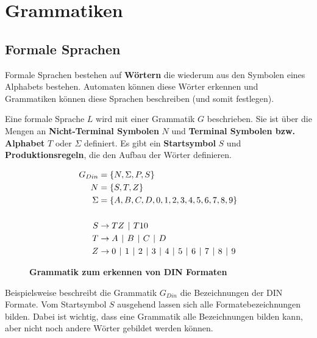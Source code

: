 

\section{Grammatiken}

\subsection{Formale Sprachen}

Formale Sprachen bestehen auf \textbf{Wörtern} die wiederum aus den Symbolen eines Alphabets
bestehen. Automaten können diese Wörter erkennen und Grammatiken können diese
Sprachen beschreiben (und somit festlegen).

Eine formale Sprache $L$ wird mit einer Grammatik $G$ beschrieben.
Sie ist über die Mengen an \textbf{Nicht-Terminal Symbolen} $N$ und
\textbf{Terminal Symbolen bzw. Alphabet} $T$ oder $\Sigma$ definiert. Es gibt ein \textbf{Startsymbol} $S$ und
\textbf{Produktionsregeln}, die den Aufbau der Wörter definieren.

\begin{figure}[h]
    \centering
    \Large
    \begin{align*}
        G_{Din} & = \{N, \Sigma, P, S\} \\
        N & = \{S, T, Z\} \\
        \Sigma & = \{A, B, C, D, 0, 1, 2, 3, 4, 5, 6, 7, 8, 9\} \\
        \\
        S & \rightarrow TZ \mkern7mu | \mkern7mu T10 \\
        T & \rightarrow A \mkern7mu | \mkern7mu B \mkern7mu | \mkern7mu C \mkern7mu | \mkern7mu D \\
        Z & \rightarrow 0 \mkern7mu | \mkern7mu 1 \mkern7mu | \mkern7mu 2 \mkern7mu | \mkern7mu 3 \mkern7mu | \mkern7mu 4 \mkern7mu | \mkern7mu 5 \mkern7mu | \mkern7mu 6 \mkern7mu | \mkern7mu 7 \mkern7mu | \mkern7mu 8 \mkern7mu | \mkern7mu 9
    \end{align*}
    \caption*{\textbf{Grammatik zum erkennen von DIN Formaten}}
\end{figure}

\normalsize
Beispielsweise beschreibt die Grammatik $G_{Din}$ die Bezeichnungen der DIN Formate.
Vom Startsymbol $S$ ausgehend lassen sich alle Formatebezeichnungen bilden.
Dabei ist wichtig, dass eine Grammatik alle Bezeichnungen bilden kann, aber nicht
noch andere Wörter gebildet werden können.

\clearpage

